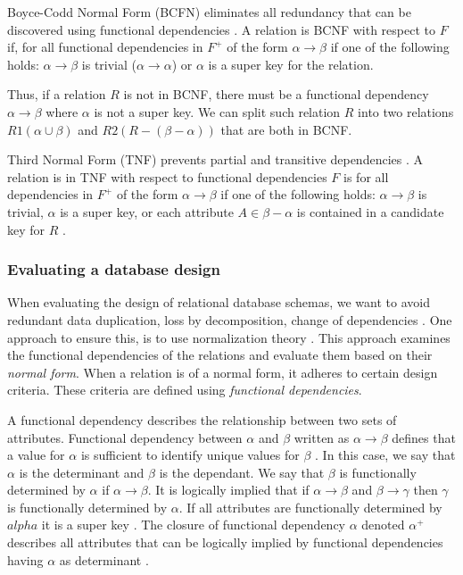 Boyce-Codd Normal Form (BCFN) eliminates all redundancy that can be discovered using functional dependencies \cite[Chapter 7.3.1]{DBSBook}. 
A relation is BCNF with respect to $F$ if, for all functional dependencies in $F^+$ of the form $\alpha \rightarrow \beta$ if one of the following holds:
$\alpha \rightarrow \beta$ is trivial ($\alpha \rightarrow \alpha$) or $\alpha$ is a super key for the relation.

Thus, if a relation $R$ is not in BCNF, there must be a functional dependency $\alpha \rightarrow \beta$ where $\alpha$ is not a super key. 
We can split such relation $R$ into two relations $R1(\alpha \cup \beta)$ and $R2(R-(\beta-\alpha))$ that are both in BCNF.

Third Normal Form (TNF) prevents partial and transitive dependencies \cite{MontayaNormalForms}.
A relation is in TNF with respect to functional dependencies $F$ is for all dependencies in $F^+$ of the form $\alpha \rightarrow \beta$ if one of the following holds: 
$\alpha \rightarrow \beta$ is trivial, $\alpha$ is a super key, or each attribute $A \in \beta-\alpha$ is contained in a candidate key for $R$ \cite[Chapter 7.5.2]{DBSBook}.


\subsubsection*{Evaluating a database design}
When evaluating the design of relational database schemas, we want to avoid redundant data duplication, loss by decomposition, change of dependencies \cite[Chapter 7, Chapter 7.3.3]{DBSBook}.
One approach to ensure this, is to use normalization theory \cite[Chapter 7.1.3]{DBSBook}. This approach examines the functional dependencies of the relations and evaluate them based on their \textit{normal form}.
When a relation is of a normal form, it adheres to certain design criteria. These criteria are defined using \textit{functional dependencies}.

A functional dependency describes the relationship between two sets of attributes. 
Functional dependency between $\alpha$ and $\beta$ written as $\alpha \rightarrow \beta$ defines that a value for $\alpha$ is sufficient to identify unique values for $\beta$ \cite[Chapter 7.4]{DBSBook}.
In this case, we say that $\alpha$ is the determinant and $\beta$ is the dependant. 
We say that $\beta$ is functionally determined by $\alpha$ if $\alpha \rightarrow \beta$.
It is logically implied that if $\alpha \rightarrow \beta$ and $\beta \rightarrow \gamma$ then $\gamma$ is functionally determined by $\alpha$.
If all attributes are functionally determined by $alpha$ it is a super key \cite[Chapter 7.4.2]{DBSBook}.
The closure of functional dependency $\alpha$ denoted $\alpha^+$ describes all attributes that can be logically implied by functional dependencies having $\alpha$ as determinant \cite[Chapter]{DBSBook}. 

